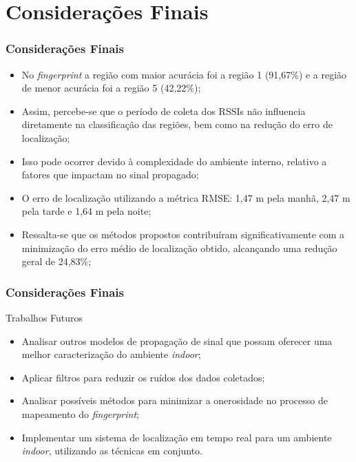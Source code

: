 \documentclass[xcolor={dvipsnames,svgnames,table}]{beamer}
\begin{document}
	\section{Considerações Finais}
	\label{consideracoes-finais}
	\begin{frame}
		\frametitle{Considerações Finais}
			\begin{itemize}[label=\textcolor{black}{\textbullet}, left=0pt]
				\justifying
				\item {\footnotesize No \textit{fingerprint} a região com maior acurácia foi a região 1 (91,67\%) e a região de menor acurácia foi a região 5 (42,22\%);}
				\item {\footnotesize Assim, percebe-se que o período de coleta dos RSSIs não influencia diretamente na classificação das regiões, bem como na redução do erro de localização;}
				\item {\footnotesize Isso pode ocorrer devido à complexidade do ambiente interno, relativo a fatores que impactam no sinal propagado;}
				\item {\footnotesize O erro de localização utilizando a métrica RMSE: 1,47 m pela manhã, 2,47 m pela tarde e 1,64 m pela noite;}
				\item {\footnotesize Ressalta-se que os métodos propostos contribuíram significativamente com a minimização do erro médio de localização obtido, alcançando uma redução geral de 24,83\%;}
			\end{itemize}
	\end{frame}
	\begin{frame}
		\frametitle{Considerações Finais}
		\begin{block}{Trabalhos Futuros}
			\begin{itemize}[label=\textcolor{black}{\textbullet}, left=5pt]
				\justifying
				\item Analisar outros modelos de propagação de sinal que possam oferecer uma melhor caracterização do ambiente \textit{indoor};
				\item Aplicar filtros para reduzir os ruídos dos dados coletados; 
				\item Analisar possíveis métodos para minimizar a onerosidade
				no processo de mapeamento do \textit{fingerprint};
				\item Implementar um sistema de localização em tempo
				real para um ambiente \textit{indoor}, utilizando as técnicas em conjunto.
			\end{itemize}
		\end{block}
	\end{frame}
\end{document}
